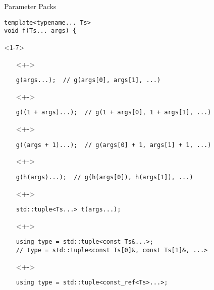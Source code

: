 \documentclass[table]{beamer}
\begin{document}
\begin{frame}[fragile]{Parameter Packs}
  \begin{verbatim}
template<typename... Ts>
void f(Ts... args) {
  \end{verbatim}

  \begin{onlyenv}<1-7>
    \begin{itemize}
    \item[]<+->
      \begin{verbatim}
g(args...);  // g(args[0], args[1], ...)
      \end{verbatim}
    \item[]<+->
      \begin{verbatim}
g((1 + args)...);  // g(1 + args[0], 1 + args[1], ...)
      \end{verbatim}
    \item[]<+->
      \begin{verbatim}
g((args + 1)...);  // g(args[0] + 1, args[1] + 1, ...)
      \end{verbatim}
    \item[]<+->
      \begin{verbatim}
g(h(args)...);  // g(h(args[0]), h(args[1]), ...)
      \end{verbatim}
    \item[]<+->
      \begin{verbatim}
std::tuple<Ts...> t(args...);
      \end{verbatim}
    \item[]<+->
      \begin{verbatim}
using type = std::tuple<const Ts&...>;
// type = std::tuple<const Ts[0]&, const Ts[1]&, ...>
      \end{verbatim}
    \item[]<+->
      \begin{verbatim}
using type = std::tuple<const_ref<Ts>...>;
      \end{verbatim}
    \end{itemize}
  \end{onlyenv}


\end{frame}
\end{document}
